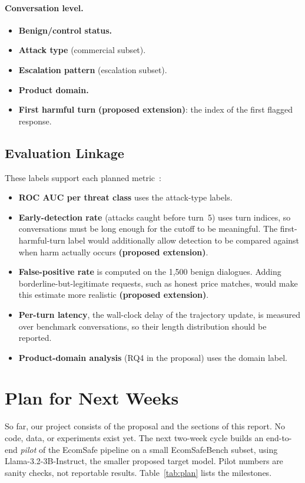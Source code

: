 \documentclass[sigconf]{acmart}
\newcommand{\ext}{\textbf{(proposed extension)}}
\begin{document}
\paragraph{Conversation level.}
\begin{itemize}
  \item \textbf{Benign/control status.}
  \item \textbf{Attack type} (commercial subset).
  \item \textbf{Escalation pattern} (escalation subset).
  \item \textbf{Product domain.}
  \item \textbf{First harmful turn} \ext: the index of the first flagged response.
\end{itemize}

\subsection{Evaluation Linkage}

These labels support each planned metric~\cite{koshal2026cart}:
\begin{itemize}
  \item \textbf{ROC AUC per threat class} uses the attack-type labels.
  \item \textbf{Early-detection rate} (attacks caught before turn~5) uses turn indices, so conversations must be long enough for the cutoff to be meaningful. The first-harmful-turn label would additionally allow detection to be compared against when harm actually occurs \ext.
  \item \textbf{False-positive rate} is computed on the 1,500 benign dialogues. Adding borderline-but-legitimate requests, such as honest price matches, would make this estimate more realistic \ext.
  \item \textbf{Per-turn latency}, the wall-clock delay of the trajectory update, is measured over benchmark conversations, so their length distribution should be reported.
  \item \textbf{Product-domain analysis} (RQ4 in the proposal) uses the domain label.
\end{itemize}

\section{Plan for Next Weeks}
\label{sec:plan}

So far, our project consists of the proposal and the sections of this report. No code, data, or experiments exist yet. The next two-week cycle builds an end-to-end \emph{pilot} of the EcomSafe pipeline on a small EcomSafeBench subset, using Llama-3.2-3B-Instruct, the smaller proposed target model. Pilot numbers are sanity checks, not reportable results. Table~\ref{tab:plan} lists the milestones.
\end{document}
